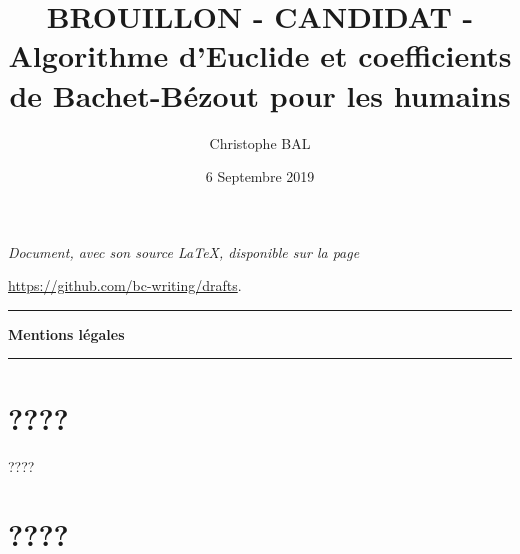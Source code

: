\documentclass[12pt]{amsart}
\begin{document}
\title{BROUILLON - CANDIDAT - Algorithme d'Euclide et coefficients de Bachet-Bézout pour les humains}
\author{Christophe BAL}
\date{6 Septembre 2019}

\maketitle

\begin{center}
    \itshape
    Document, avec son source \LaTeX, disponible sur la page
    
    \url{https://github.com/bc-writing/drafts}.
\end{center}


\bigskip


\begin{center}
    \hrule\vspace{.3em}
    {
        \fontsize{1.35em}{1em}\selectfont
        \textbf{Mentions \og légales \fg}
    }
            
    \vspace{0.45em}
    \doclicenseThis
    \hrule
\end{center}


\setcounter{tocdepth}{2}
\tableofcontents


\section{????}

????




\section{????}
\end{document}
